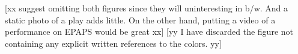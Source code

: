 \documentclass[prb,amssymb,preprint]{revtex4}
\begin{document}
[xx suggest omitting both figures since they will uninteresting in b/w. And a static photo of a play adds little. On the other hand, putting a video of a performance on EPAPS would be great xx]
[yy I have discarded the figure not containing any explicit written references to the colors. yy]

\end{document}

